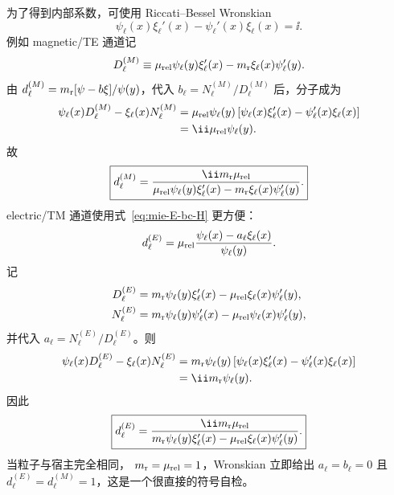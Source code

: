 为了得到内部系数，可使用 Riccati--Bessel Wronskian
\begin{equation}
\psi_\ell(x)\xi_\ell'(x)
-\psi_\ell'(x)\xi_\ell(x)=\ii.
\label{eq:riccati-wronskian}
\end{equation}
例如 magnetic/TE 通道记
\begin{equation}
D_\ell^{(M)}
\equiv
\mu_{\rm rel}\psi_\ell(y)\xi_\ell'(x)
-m_{\rm r}\xi_\ell(x)\psi_\ell'(y).
\end{equation}
由
$d_\ell^{(M)}=m_{\rm r}[\psi-b\xi]/\psi(y)$，代入
$b_\ell=N_\ell^{(M)}/D_\ell^{(M)}$ 后，分子成为
\begin{align}
\psi_\ell(x)D_\ell^{(M)}
-\xi_\ell(x)N_\ell^{(M)}
&=\mu_{\rm rel}\psi_\ell(y)
\left[
\psi_\ell(x)\xi_\ell'(x)
-\psi_\ell'(x)\xi_\ell(x)
\right]
\\
&=\ii\mu_{\rm rel}\psi_\ell(y).
\end{align}
故
\begin{equation}
\boxed{
d_\ell^{(M)}
=\frac{\ii m_{\rm r}\mu_{\rm rel}}
{\mu_{\rm rel}\psi_\ell(y)\xi_\ell'(x)
-m_{\rm r}\xi_\ell(x)\psi_\ell'(y)}.}
\label{eq:mie-internal-M}
\end{equation}
electric/TM 通道使用式~\eqref{eq:mie-E-bc-H} 更方便：
\begin{equation}
d_\ell^{(E)}
=\mu_{\rm rel}
\frac{\psi_\ell(x)-a_\ell\xi_\ell(x)}{\psi_\ell(y)}.
\end{equation}
记
\begin{align}
D_\ell^{(E)}&=m_{\rm r}\psi_\ell(y)\xi_\ell'(x)
-\mu_{\rm rel}\xi_\ell(x)\psi_\ell'(y),\\
N_\ell^{(E)}&=m_{\rm r}\psi_\ell(y)\psi_\ell'(x)
-\mu_{\rm rel}\psi_\ell(x)\psi_\ell'(y),
\end{align}
并代入 $a_\ell=N_\ell^{(E)}/D_\ell^{(E)}$。则
\begin{align}
\psi_\ell(x)D_\ell^{(E)}-\xi_\ell(x)N_\ell^{(E)}
&=m_{\rm r}\psi_\ell(y)
\left[\psi_\ell(x)\xi_\ell'(x)-\psi_\ell'(x)\xi_\ell(x)\right]\\
&=\ii m_{\rm r}\psi_\ell(y).
\end{align}
因此
\begin{equation}
\boxed{
d_\ell^{(E)}
=\frac{\ii m_{\rm r}\mu_{\rm rel}}
{m_{\rm r}\psi_\ell(y)\xi_\ell'(x)
-\mu_{\rm rel}\xi_\ell(x)\psi_\ell'(y)}.}
\label{eq:mie-internal-E}
\end{equation}
当粒子与宿主完全相同，
$m_{\rm r}=\mu_{\rm rel}=1$，Wronskian 立即给出
$a_\ell=b_\ell=0$ 且
$d_\ell^{(E)}=d_\ell^{(M)}=1$，这是一个很直接的符号自检。

